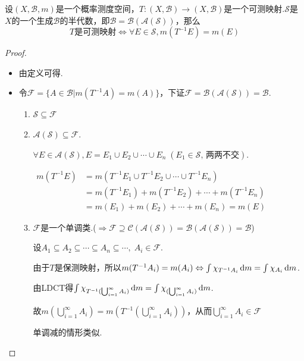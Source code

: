 \begin{theorem}[保测映射的验证方法]
    设$(X,\mathcal{B},m)$是一个概率测度空间，$T:(X,\mathcal{B}) \to (X,\mathcal{B})$是一个可测映射.$\mathcal{S}$是$X$的一个生成$\mathcal{B}$的半代数，即$\mathcal{B}=\mathcal{B}(\mathcal{A}(\mathcal{S}))$，那么
    \[ T\text{是可测映射} \Longleftrightarrow \forall E \in \mathcal{S},m(T^{-1}E) = m(E) \]
\end{theorem}
\begin{proof}
    \begin{itemize}[leftmargin = 3.5em]
        \item[“$\Rightarrow$”] 由定义可得.
        \item[“$\Leftarrow$”] 令$\mathcal{F} = \{A\in\mathcal{B}|m(T^{-1}A)=m(A)\}$，下证$\mathcal{F}=\mathcal{B}(\mathcal{A}(\mathcal{S}))=\mathcal{B}$.\par
        \begin{enumerate}[leftmargin=0em,label=(\roman*)]
            \item $\mathcal{S}\subseteq\mathcal{F}$
            \item $\mathcal{A}(\mathcal{S})\subseteq\mathcal{F}$.\par
            $\forall E\in\mathcal{A}(\mathcal{S}),E=E_1\cup E_2\cup\cdots\cup E_n \;(E_1\in\mathcal{S},\,\text{两两不交})$.\par
            $\begin{aligned}
                m(T^{-1}E) &= m(T^{-1}E_1\cup T^{-1}E_2\cup\cdots\cup T^{-1}E_n)\\
                &=m(T^{-1}E_1)+m(T^{-1}E_2)+\cdots+m(T^{-1}E_n)\\
                &=m(E_1)+m(E_2)+\cdots+m(E_n)=m(E)
            \end{aligned}$\par
            \item $\mathcal{F}$是一个单调类.($\Rightarrow \mathcal{F}\supseteq\mathcal{C}(\mathcal{A}(\mathcal{S}))=\mathcal{B}(\mathcal{A}(\mathcal{S}))=\mathcal{B}$)\par
            设$A_1\subseteq A_2\subseteq \cdots\subseteq A_n\subseteq\cdots,\;A_i\in\mathcal{F}$.\par
            由于$T$是保测映射，所以$m(T^{-1}A_i)=m(A_i) \Leftrightarrow \int{\chi_{T^{-1}A_i}}\mathop{}\!\mathrm{d} m=\int {\chi_{A_i}}\mathop{}\!\mathrm{d} m$.\par
            由LDCT得$\int{\chi_{T^{-1}(\bigcup_{i=1}^\infty{A_i})}}\mathop{}\!\mathrm{d} m=\int{\chi_{(\bigcup_{i=1}^\infty{A_i})}}\mathop{}\!\mathrm{d} m$.\par
            故$m\left(\bigcup_{i=1}^\infty{A_i}\right) = m\left(T^{-1}\left(\bigcup_{i=1}^\infty{A_i}\right)\right)$，从而$\bigcup_{i=1}^\infty{A_i}\in\mathcal{F}$\par
            单调减的情形类似.\qedhere
        \end{enumerate}
    \end{itemize}
\end{proof}

